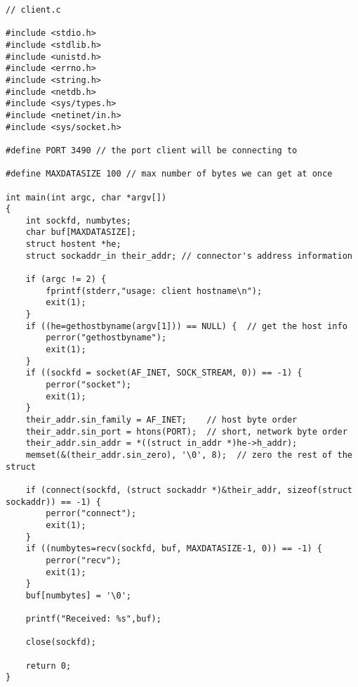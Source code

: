 \documentclass[a4paper]{article}
\begin{document}
\begin{lstlisting}
// client.c

#include <stdio.h>
#include <stdlib.h>
#include <unistd.h>
#include <errno.h>
#include <string.h>
#include <netdb.h>
#include <sys/types.h>
#include <netinet/in.h>
#include <sys/socket.h>

#define PORT 3490 // the port client will be connecting to 

#define MAXDATASIZE 100 // max number of bytes we can get at once 

int main(int argc, char *argv[])
{
    int sockfd, numbytes;  
    char buf[MAXDATASIZE];
    struct hostent *he;
    struct sockaddr_in their_addr; // connector's address information 

    if (argc != 2) {
        fprintf(stderr,"usage: client hostname\n");
        exit(1);
    }
    if ((he=gethostbyname(argv[1])) == NULL) {  // get the host info 
        perror("gethostbyname");
        exit(1);
    }
    if ((sockfd = socket(AF_INET, SOCK_STREAM, 0)) == -1) {
        perror("socket");
        exit(1);
    }
    their_addr.sin_family = AF_INET;    // host byte order 
    their_addr.sin_port = htons(PORT);  // short, network byte order 
    their_addr.sin_addr = *((struct in_addr *)he->h_addr);
    memset(&(their_addr.sin_zero), '\0', 8);  // zero the rest of the struct 

    if (connect(sockfd, (struct sockaddr *)&their_addr, sizeof(struct sockaddr)) == -1) {
        perror("connect");
        exit(1);
    }
    if ((numbytes=recv(sockfd, buf, MAXDATASIZE-1, 0)) == -1) {
        perror("recv");
        exit(1);
    }
    buf[numbytes] = '\0';

    printf("Received: %s",buf);

    close(sockfd);

    return 0;
}
\end{lstlisting}
\end{document}
